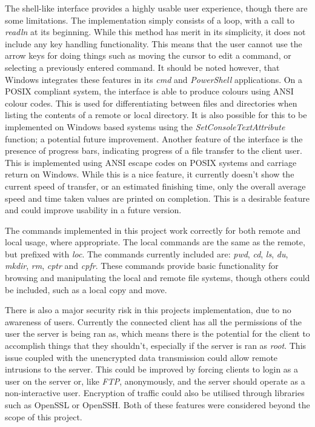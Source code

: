 \documentclass[a4paper]{article}
\begin{document}
The shell-like interface provides a highly usable user experience, though there are some limitations. The implementation simply consists of a loop, with a call to \textit{readln} at its beginning. While this method has merit in its simplicity, it does not include any key handling functionality. This means that the user cannot use the arrow keys for doing things such as moving the cursor to edit a command, or selecting a previously entered command. It should be noted however, that Windows integrates these features in its \textit{cmd} and \textit{PowerShell} applications.
On a POSIX compliant system, the interface is able to produce colours using ANSI colour codes. This is used for differentiating between files and directories when listing the contents of a remote or local directory. It is also possible for this to be implemented on Windows based systems using the \textit{SetConsoleTextAttribute} function; a potential future improvement.
Another feature of the interface is the presence of progress bars, indicating progress of a file transfer to the client user. This is implemented using ANSI escape codes on POSIX systems and carriage return on Windows. While this is a nice feature, it currently doesn't show the current speed of transfer, or an estimated finishing time, only the overall average speed and time taken values are printed on completion. This is a desirable feature and could improve usability in a future version.

The commands implemented in this project work correctly for both remote and local usage, where appropriate. The local commands are the same as the remote, but prefixed with \textit{loc}. The commands currently included are: \textit{pwd}, \textit{cd}, \textit{ls}, \textit{du}, \textit{mkdir}, \textit{rm}, \textit{cptr} and \textit{cpfr}. These commands provide basic functionality for browsing and manipulating the local and remote file systems, though others could be included, such as a local copy and move.

There is also a major security risk in this projects implementation, due to no awareness of users. Currently the connected client has all the permissions of the user the server is being ran as, which means there is the potential for the client to accomplish things that they shouldn't, especially if the server is ran as \textit{root}. This issue coupled with the unencrypted data transmission could allow remote intrusions to the server. This could be improved by forcing clients to login as a user on the server or, like \textit{FTP}, anonymously, and the server should operate as a non-interactive user. Encryption of traffic could also be utilised through libraries such as OpenSSL or OpenSSH. Both of these features were considered beyond the scope of this project.
\end{document}
